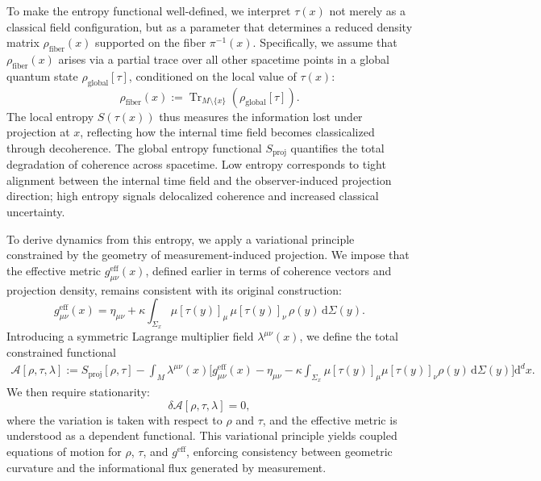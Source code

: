 \documentclass[11pt]{article}
\begin{document}
To make the entropy functional well-defined, we interpret \( \tau(x) \) not merely as a classical field configuration, but as a parameter that determines a reduced density matrix \( \rho_{\text{fiber}}(x) \) supported on the fiber \( \pi^{-1}(x) \). Specifically, we assume that \( \rho_{\text{fiber}}(x) \) arises via a partial trace over all other spacetime points in a global quantum state \( \rho_{\text{global}}[\tau] \), conditioned on the local value of \( \tau(x) \):
\[
\rho_{\text{fiber}}(x) := \operatorname{Tr}_{M \setminus \{x\}} \left( \rho_{\text{global}}[\tau] \right).
\]
The local entropy \( S(\tau(x)) \) thus measures the information lost under projection at \( x \), reflecting how the internal time field becomes classicalized through decoherence. The global entropy functional \( S_{\mathrm{proj}} \) quantifies the total degradation of coherence across spacetime. Low entropy corresponds to tight alignment between the internal time field and the observer-induced projection direction; high entropy signals delocalized coherence and increased classical uncertainty.

To derive dynamics from this entropy, we apply a variational principle constrained by the geometry of measurement-induced projection. We impose that the effective metric \( g^{\mathrm{eff}}_{\mu\nu}(x) \), defined earlier in terms of coherence vectors and projection density, remains consistent with its original construction:
\begin{equation}
g^{\mathrm{eff}}_{\mu\nu}(x) = \eta_{\mu\nu} + \kappa \int_{\Sigma_x} \mu[\tau(y)]_\mu \, \mu[\tau(y)]_\nu \, \rho(y) \, \mathrm{d}\Sigma(y).
\end{equation}
Introducing a symmetric Lagrange multiplier field \( \lambda^{\mu\nu}(x) \), we define the total constrained functional
\begin{align}
\mathcal{A}[\rho, \tau, \lambda] := S_{\mathrm{proj}}[\rho, \tau]
- \int_M \lambda^{\mu\nu}(x) \Big[
g^{\mathrm{eff}}_{\mu\nu}(x) - \eta_{\mu\nu} - \kappa \int_{\Sigma_x} \mu[\tau(y)]_\mu \mu[\tau(y)]_\nu \rho(y) \, \mathrm{d}\Sigma(y)
\Big] \mathrm{d}^d x.
\end{align}
We then require stationarity:
\begin{equation}
\delta \mathcal{A}[\rho, \tau, \lambda] = 0,
\end{equation}
where the variation is taken with respect to \( \rho \) and \( \tau \), and the effective metric is understood as a dependent functional. This variational principle yields coupled equations of motion for \( \rho \), \( \tau \), and \( g^{\mathrm{eff}} \), enforcing consistency between geometric curvature and the informational flux generated by measurement.
\end{document}

